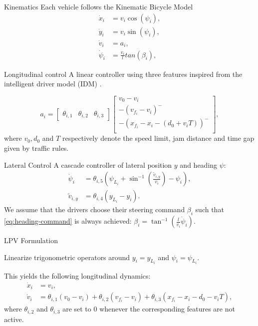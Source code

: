 \documentclass[slideopt,A4,showboxes,svgnames]{beamer}
\begin{document}
\begin{frame}{Kinematics}
Each vehicle follows the Kinematic Bicycle Model
\begin{align}
	\dot{x}_i &= v_i\cos(\psi_i), \nonumber\\
	\dot{y}_i &= v_i\sin(\psi_i), \nonumber\\
	\dot{v}_i &= a_i, \nonumber\\
	\dot{\psi}_i &= \frac{v_i}{l}tan(\beta_i), \nonumber
\end{align}
\end{frame}

\begin{frame}{Longitudinal control}
A linear controller using three features inspired from the intelligent driver model (IDM) \cite{Treiber2000}.

	\begin{equation*}
	a_i = \begin{bmatrix}
	\theta_{i,1} & \theta_{i,2} & \theta_{i,3}
	\end{bmatrix} \begin{bmatrix}
	v_0 - v_i \\
	-(v_{f_i}-v_i)^- \\
	-(x_{f_i} - x_i - (d_0 + v_iT))^- \\
	\end{bmatrix},
	\label{eq:theta_a}
	\end{equation*}
	where $v_0, d_0$ and $T$ respectively denote the speed limit, jam distance and time gap given by traffic rules.
\end{frame}

\begin{frame}{Lateral Control}
A cascade controller of lateral position $y$ and heading $\psi$:
\begin{align}
\label{eq:heading-command}
\dot{\psi}_i &= \theta_{i,5}\left(\psi_{L_i}+\sin^{-1}\left(\frac{\tilde{v}_{i,y}}{v_i}\right)-\psi_i\right),\\
\tilde{v}_{i,y} &= \theta_{i,4} (y_{L_i}-y_i). \nonumber
\end{align}
We assume that the drivers choose their steering command $\beta_i$ such that \eqref{eq:heading-command} is always achieved: $\beta_i = \tan^{-1}(\frac{l}{v_i}\dot{\psi}_i)$.
\end{frame}

\begin{frame}{LPV Formulation}

Linearize trigonometric operators around $y_i=y_{L_i}$ and $\psi_i=\psi_{L_i}$.

This yields the following longitudinal dynamics:
\begin{align*}
\dot{x}_i &= v_i,\\
\dot v_i &= \theta_{i,1} (v_0 - v_i) + \theta_{i,2} (v_{f_i} - v_i) + \theta_{i,3}(x_{f_i} - x_i - d_0 - v_i T),
\end{align*}
where $\theta_{i,2}$ and $\theta_{i,3}$ are set to $0$ whenever the corresponding features are not active.
\end{frame}
\end{document}
